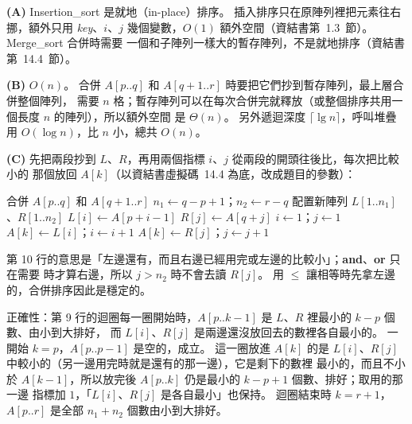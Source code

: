 \begin{pastsoln}
\textbf{(A)} Insertion\_sort 是就地（in-place）排序。 插入排序只在原陣列裡把元素往右挪，額外只用
\textit{key}、$i$、$j$ 幾個變數，$O(1)$ 額外空間（資結書第~1.3~節）。 Merge\_sort 合併時需要
一個和子陣列一樣大的暫存陣列，不是就地排序（資結書第~14.4~節）。

\textbf{(B)} $O(n)$。 合併 $A[p..q]$ 和 $A[q+1..r]$ 時要把它們抄到暫存陣列，最上層合併整個陣列，
需要 $n$ 格；暫存陣列可以在每次合併完就釋放（或整個排序共用一個長度 $n$ 的陣列），所以額外空間
是 $\Theta(n)$。 另外遞迴深度 $\lceil \lg n \rceil$，呼叫堆疊用 $O(\log n)$，比 $n$ 小，總共 $O(n)$。

\textbf{(C)} 先把兩段抄到 $L$、$R$，再用兩個指標 $i$、$j$ 從兩段的開頭往後比，每次把比較小的
那個放回 $A[k]$（以資結書虛擬碼~14.4 為底，改成題目的參數）：

\begin{pseudo}{合併 $A[p..q]$ 和 $A[q+1..r]$}
    \State $n_1 \gets q - p + 1$；$n_2 \gets r - q$
    \State 配置新陣列 $L[1..n_1]$、$R[1..n_2]$
        \State $L[i] \gets A[p + i - 1]$
    \EndFor
        \State $R[j] \gets A[q + j]$
    \EndFor
    \State $i \gets 1$；$j \gets 1$
            \State $A[k] \gets L[i]$；$i \gets i + 1$
        \Else
            \State $A[k] \gets R[j]$；$j \gets j + 1$
        \EndIf
    \EndFor
\EndProcedure
\end{pseudo}

第 10 行的意思是「左邊還有，而且右邊已經用完或左邊的比較小」；\textbf{and}、\textbf{or} 只在需要
時才算右邊，所以 $j > n_2$ 時不會去讀 $R[j]$。 用 $\le$ 讓相等時先拿左邊的，合併排序因此是穩定的。

正確性：第 9 行的迴圈每一圈開始時，$A[p..k-1]$ 是 $L$、$R$ 裡最小的 $k - p$ 個數、由小到大排好，
而 $L[i]$、$R[j]$ 是兩邊還沒放回去的數裡各自最小的。 一開始 $k = p$，$A[p..p-1]$ 是空的，成立。
這一圈放進 $A[k]$ 的是 $L[i]$、$R[j]$ 中較小的（另一邊用完時就是還有的那一邊），它是剩下的數裡
最小的，而且不小於 $A[k-1]$，所以放完後 $A[p..k]$ 仍是最小的 $k - p + 1$ 個數、排好；取用的那一邊
指標加 $1$，「$L[i]$、$R[j]$ 是各自最小」也保持。 迴圈結束時 $k = r + 1$，$A[p..r]$ 是全部
$n_1 + n_2$ 個數由小到大排好。


\end{pastsoln}
